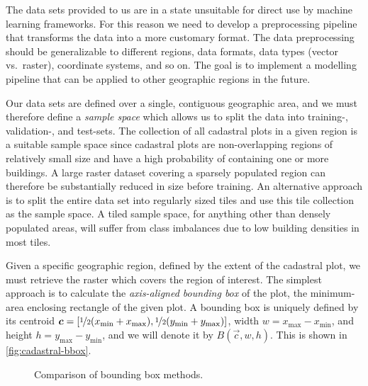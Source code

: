 The data sets provided to us are in a state unsuitable for direct use by machine learning frameworks.
For this reason we need to develop a preprocessing pipeline that transforms the data into a more customary format.
The data preprocessing should be generalizable to different regions, data formats, data types (vector vs.\ raster), coordinate systems, and so on.
The goal is to implement a modelling pipeline that can be applied to other geographic regions in the future.

Our data sets are defined over a single, contiguous geographic area, and we must therefore define a \textit{sample space} which allows us to split the data into training-, validation-, and test-sets.
The collection of all cadastral plots in a given region is a suitable sample space since cadastral plots are non-overlapping regions of relatively small size and have a high probability of containing one or more buildings.
A large raster dataset covering a sparsely populated region can therefore be substantially reduced in size before training.
An alternative approach is to split the entire data set into regularly sized tiles and use this tile collection as the sample space.
A tiled sample space, for anything other than densely populated areas, will suffer from class imbalances due to low building densities in most tiles.

Given a specific geographic region, defined by the extent of the cadastral plot, we must retrieve the raster which covers the region of interest.
The simplest approach is to calculate the \textit{axis-aligned bounding box} of the plot, the minimum-area enclosing rectangle of the given plot.
A bounding box is uniquely defined by its centroid $\vec{c} = [\nicefrac{1}{2}(x_{\mathrm{\min}} + x_{\mathrm{\max}}), \nicefrac{1}{2}(y_{\mathrm{\min}} + y_{\mathrm{\max}})]$, width $w = x_{\mathrm{\max}} - x_{\mathrm{\min}}$, and height $h = y_{\mathrm{\max}} - y_{\mathrm{\min}}$, and we will denote it by $B(\vec{c}, w, h)$.
This is shown in \cref{fig:cadastral-bbox}.

\begin{figure}[htb]
  \captionsetup[subfigure]{position=b}
  \centering
  \hspace{2em}
  \caption{Comparison of bounding box methods.}
\end{figure}


